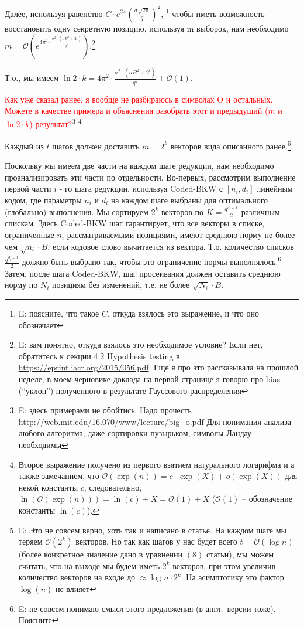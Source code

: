 \documentclass[a4paper,11pt]{article}
\newcommand{\bigO}{\mathcal{O}}
\newcommand{\smallo}{o} %
\begin{document}
Далее, используя равенство $C \cdot e^{2\pi}(\frac{\sigma \sqrt{2\pi}}{q})^2$, \footnote{E: поясните, что такое $C$, откуда взялось это выражение, и что оно обозначает} чтобы иметь возможность восстановить одну секретную позицию, используя m выборок, нам необходимо $m=\bigO\left(e^{4\pi^2 \cdot \frac{\sigma^2 \cdot (nB^2+2^t)}{q^2}}\right)$.\footnote{E: вам понятно, откуда взялось это необходимое условие? Если нет, обратитесь к секции 4.2 Hypothesis testing в \url{https://eprint.iacr.org/2015/056.pdf}. Еще я про это рассказывала на прошлой неделе, в моем черновике доклада на первой странице я говорю про bias (``уклон'') полученного в результате Гауссового распределения }

Т.о., мы имеем $\ln{2} \cdot k = 4\pi^2 \cdot \frac{\sigma^2 \cdot (nB^2+2^t)}{q^2} + \bigO(1)$.

\textcolor{red}{Как уже сказал ранее, я вообще не разбираюсь в символах O и остальных. Можете в качестве примера и объяснения разобрать этот и предыдущий ($m$ и $\ln{2} \cdot k$) результат?}\footnote{E: здесь примерами не обойтись. Надо прочесть \url{http://web.mit.edu/16.070/www/lecture/big_o.pdf}
Для понимания анализа любого алгоритма, даже сортировки пузырьком, символы Ландау необходимы
}
\footnote{Второе выражение получено из первого взятием натурального логарифма и а также замечанием, что $\bigO(\exp(n)) = c \cdot \exp(X) + \smallo(\exp(X))$ для некой константы $c$, следовательно, $ \ln(\bigO(\exp(n)) ) = \ln(c) + X = \bigO(1) + X$ ($\bigO(1)$ -- обозначение константы $\ln(c)$).  }

Каждый из $t$ шагов должен доставить $m=2^k$ векторов вида описанного ранее.\footnote{E: Это не совсем верно, хоть так и написано в статье. На каждом шаге мы теряем $\bigO(2^k)$ векторов. Но так как шагов у нас будет всего $t = \bigO(\log n)$ (более конкретное значение дано в уравнении $(8)$ статьи), мы можем считать, что на выходе мы будем иметь $2^k$ векторов, при этом увеличив количество векторов на входе до $\approx \log n \cdot 2^k$. На асимптотику это фактор $\log(n)$ не влияет}

Поскольку мы имеем две части на каждом шаге редукции, нам необходимо проанализировать эти части по отдельности. Во-первых, рассмотрим выполнение первой части $i$ - го шага редукции, используя Coded-BKW с $[n_i,d_i]$ линейным кодом, где параметры $n_i$ и $d_i$ на каждом шаге выбраны для оптимального (глобально) выполнения. Мы сортируем $2^k$ векторов по $K=\frac{q^{d_i - 1}}{2}$ различным спискам. Здесь Coded-BKW шаг гарантирует, что все векторы в списке, ограниченные $n_i$ рассматриваемыми позициями, имеют среднюю норму не более чем $\sqrt{n_i}\cdot B$, если кодовое слово вычитается из вектора. Т.о. количество списков $\frac{q^{d_i - 1}}{2}$ должно быть выбрано так, чтобы это ограничение нормы выполнялось.\footnote{E: не совсем понимаю смысл этого предложения (в англ.\ версии тоже). Поясните} Затем, после шага Coded-BKW, шаг просеивания должен оставить среднюю норму по $N_i$ позициям без изменений, т.е. не более $\sqrt{N_i}\cdot B$.
\end{document}
